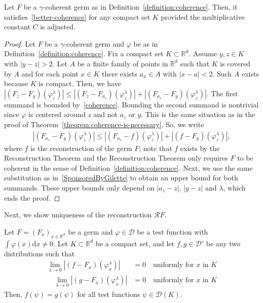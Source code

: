 \begin{proposition}\label{proposition:cutoff}
    Let \(F\) be a \(\gamma\)-coherent germ as in Definition~\ref{definition:coherence}. Then, it satisfies~\eqref{better-coherence} for any compact set \(K\) provided the multiplicative constant \(C\) is adjusted.
\end{proposition}

\begin{proof}
    Let \(F\) be a \(\gamma\)-coherent germ and \(\varphi\) be as in Definition~\ref{definition:coherence}. Fix a compact set \(K \subset \mathbb{R}^d\). Assume \(y,z \in K\) with \(|y-z| > 2\). Let \(A\) be a finite family of points in \(\mathbb{R}^d\) such that \(K\) is covered by \(A\) and for each point \(x \in K\) there exists \(a_x \in A\) with \(|x-a| < 2\). Such \(A\) exists because \(K\) is compact. Then, we have \(|(F_z - F_y)(\varphi^\lambda_z)| \leq |(F_z - F_{a_z})(\varphi^\lambda_z)| + |(F_{a_z} - F_y)(\varphi^\lambda_z)|\). The first summand is bounded by~\eqref{coherence}. Bounding the second summand is nontrivial since \(\varphi\) is centered around \(z\) and not \(a_z\) or \(y\). This is the same situation as in the proof of Theorem~\ref{theorem:coherence-is-necessary}. So, we write
    \begin{align*}
        |(F_{a_z} - F_y)(\varphi^\lambda_z)| \leq |(F_{a_z} - f)(\varphi^\lambda_z)| + |(f - F_y)(\varphi^\lambda_z)|,
    \end{align*}
    where \(f\) is the reconstruction of the germ \(F\); note that \(f\) exists by the Reconstruction Theorem and the Reconstruction Theorem only requires \(F\) to be coherent in the sense of Definition~\ref{definition:coherence}. Next, we use the same substitution as in~\eqref{SponsoredByGilette} to obtain an upper bound for both summands. These upper bounds only depend on \(|a_z - z|\), \(|y - z|\) and \(\lambda\), which ends the proof.  
\end{proof}

Next, we show uniqueness of the reconstruction \( \mathcal{R}F \). 

\begin{theorem}[Uniqueness]\label{theorem:uniqueness-reconstruction}
   Let \(F = {(F_x)}_{x \in \mathbb{R}^d}\) be a germ and \(\varphi \in \mathcal{D}\) be a test function with \(\int \varphi(x) \mathrm{d}x \neq 0\). Let \(K \subset \mathbb{R}^d\) be a compact set, and let \(f, g \in \mathcal{D}'\) be any two distributions such that
   \begin{align*}
       \lim_{\lambda \to 0} |(f-F_x)(\varphi^\lambda_x)| &= 0 \quad \text{uniformly for \(x\) in \(K\)} \\ 
       \quad \lim_{\lambda \to 0} |(g-F_x)(\varphi^\lambda_x)| &= 0 \quad \text{uniformly for \(x\) in \(K\)}
   \end{align*} 
    Then, \(f(\psi) = g(\psi)\) for all test functions \(\psi \in \mathcal{D}(K)\).  
\end{theorem}

